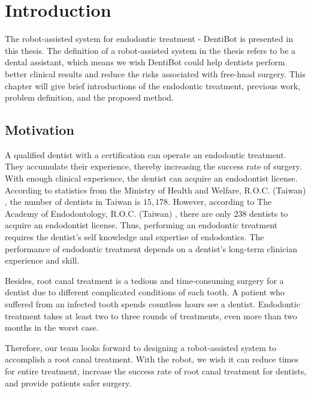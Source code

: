 \chapter{Introduction}
\hspace*{6mm}The robot-assisted system for endodontic treatment - DentiBot is presented in this thesis. The definition of a robot-assisted system in the thesis refers to be a dental assistant, which means we wish DentiBot could help dentists perform better clinical results and reduce the risks associated with free-hnad surgery. This chapter will give brief introductions of the endodontic treatment, previous work, problem definition, and the proposed method.
\section{Motivation}
\hspace*{6mm}A qualified dentist with a certification can operate an endodontic treatment. They accumulate their experience, thereby increasing the success rate of surgery. With enough clinical experience, the dentist can acquire an endodontist license. According to statistics from the Ministry of Health and Welfare, R.O.C. (Taiwan) \cite{web1}, the number of dentists in Taiwan is $15,178$. However, according to The Academy of Endodontology, R.O.C. (Taiwan) \cite{web2}, there are only $238$ dentists to acquire an endodontist license. Thus, performing an endodontic treatment requires the dentist's self knowledge and expertise of endodontics. The performance of endodontic treatment depends on a dentist's long-term clinician experience and skill. 
\par
Besides, root canal treatment is a tedious and time-consuming surgery for a dentist due to different complicated conditions of each tooth. A patient who suffered from an infected tooth spends countless hours see a dentist. Endodontic treatment takes at least two to three rounds of treatments, even more than two months in the worst case.  
\par
Therefore, our team looks forward to designing a robot-assisted system to accomplish a root canal treatment.  With the robot, we wish it can reduce times for entire treatment, increase the success rate of root canal treatment for dentists, and provide patients safer surgery.
